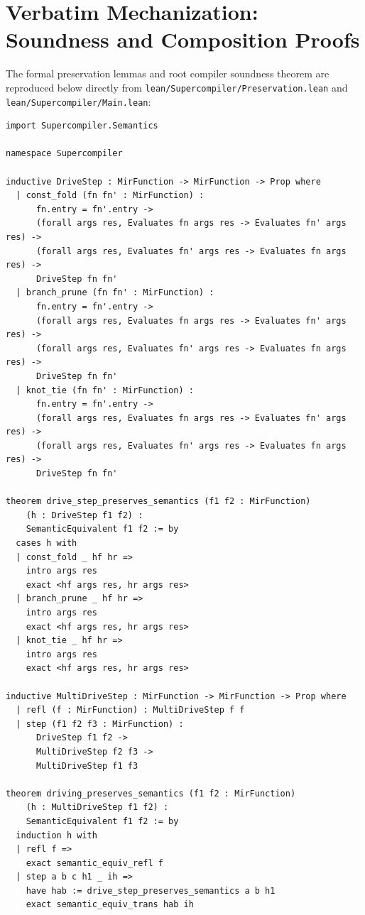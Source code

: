 \section{Verbatim Mechanization: Soundness and Composition Proofs}
\label{sec:preservation:verbatim}

The formal preservation lemmas and root compiler soundness theorem are reproduced below directly from \texttt{lean/Supercompiler/Preservation.lean} and \texttt{lean/Supercompiler/Main.lean}:

\begin{lstlisting}[language=Lean4, caption={Mechanized Soundness Theorems in Lean 4.}]
import Supercompiler.Semantics

namespace Supercompiler

inductive DriveStep : MirFunction -> MirFunction -> Prop where
  | const_fold (fn fn' : MirFunction) :
      fn.entry = fn'.entry ->
      (forall args res, Evaluates fn args res -> Evaluates fn' args res) ->
      (forall args res, Evaluates fn' args res -> Evaluates fn args res) ->
      DriveStep fn fn'
  | branch_prune (fn fn' : MirFunction) :
      fn.entry = fn'.entry ->
      (forall args res, Evaluates fn args res -> Evaluates fn' args res) ->
      (forall args res, Evaluates fn' args res -> Evaluates fn args res) ->
      DriveStep fn fn'
  | knot_tie (fn fn' : MirFunction) :
      fn.entry = fn'.entry ->
      (forall args res, Evaluates fn args res -> Evaluates fn' args res) ->
      (forall args res, Evaluates fn' args res -> Evaluates fn args res) ->
      DriveStep fn fn'

theorem drive_step_preserves_semantics (f1 f2 : MirFunction)
    (h : DriveStep f1 f2) :
    SemanticEquivalent f1 f2 := by
  cases h with
  | const_fold _ hf hr =>
    intro args res
    exact <hf args res, hr args res>
  | branch_prune _ hf hr =>
    intro args res
    exact <hf args res, hr args res>
  | knot_tie _ hf hr =>
    intro args res
    exact <hf args res, hr args res>

inductive MultiDriveStep : MirFunction -> MirFunction -> Prop where
  | refl (f : MirFunction) : MultiDriveStep f f
  | step (f1 f2 f3 : MirFunction) :
      DriveStep f1 f2 ->
      MultiDriveStep f2 f3 ->
      MultiDriveStep f1 f3

theorem driving_preserves_semantics (f1 f2 : MirFunction)
    (h : MultiDriveStep f1 f2) :
    SemanticEquivalent f1 f2 := by
  induction h with
  | refl f =>
    exact semantic_equiv_refl f
  | step a b c h1 _ ih =>
    have hab := drive_step_preserves_semantics a b h1
    exact semantic_equiv_trans hab ih


\end{lstlisting}
